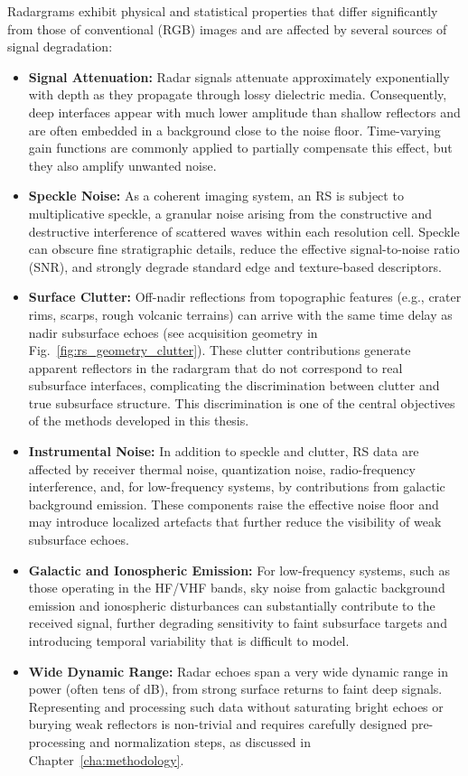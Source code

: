 Radargrams exhibit physical and statistical properties that differ significantly from those of conventional (RGB) images and are affected by several sources of signal degradation:
\begin{itemize}
    \item \textbf{Signal Attenuation:} Radar signals attenuate approximately exponentially with depth as they propagate through lossy dielectric media. Consequently, deep interfaces appear with much lower amplitude than shallow reflectors and are often embedded in a background close to the noise floor. Time-varying gain functions are commonly applied to partially compensate this effect, but they also amplify unwanted noise.
    \item \textbf{Speckle Noise:} As a coherent imaging system, an RS is subject to multiplicative speckle, a granular noise arising from the constructive and destructive interference of scattered waves within each resolution cell. Speckle can obscure fine stratigraphic details, reduce the effective signal-to-noise ratio (SNR), and strongly degrade standard edge and texture-based descriptors.
    \item \textbf{Surface Clutter:} Off-nadir reflections from topographic features (e.g., crater rims, scarps, rough volcanic terrains) can arrive with the same time delay as nadir subsurface echoes (see acquisition geometry in Fig.~\ref{fig:rs_geometry_clutter}). These clutter contributions generate apparent reflectors in the radargram that do not correspond to real subsurface interfaces, complicating the discrimination between clutter and true subsurface structure. This discrimination is one of the central objectives of the methods developed in this thesis.
    \item \textbf{Instrumental Noise:} In addition to speckle and clutter, RS data are affected by receiver thermal noise, quantization noise, radio-frequency interference, and, for low-frequency systems, by contributions from galactic background emission. These components raise the effective noise floor and may introduce localized artefacts that further reduce the visibility of weak subsurface echoes.
    \item \textbf{Galactic and Ionospheric Emission:} For low-frequency systems, such as those operating in the HF/VHF bands, sky noise from galactic background emission and ionospheric disturbances can substantially contribute to the received signal, further degrading sensitivity to faint subsurface targets and introducing temporal variability that is difficult to model.
    \item \textbf{Wide Dynamic Range:} Radar echoes span a very wide dynamic range in power (often tens of dB), from strong surface returns to faint deep signals. Representing and processing such data without saturating bright echoes or burying weak reflectors is non-trivial and requires carefully designed pre-processing and normalization steps, as discussed in Chapter~\ref{cha:methodology}.
\end{itemize}

